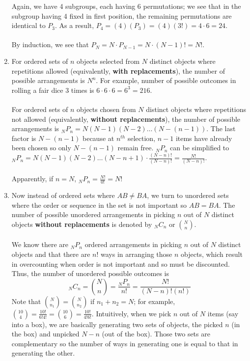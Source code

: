 \documentclass[12pt]{article}
\begin{document}
\begin{enumerate}
{\begin{tabular}{c c c c}
\end{tabular} \par
}

Again, we have 4 subgroups, each having 6 permutations; we see that in the subgroup having 4 fixed in first position, the remaining permutations are identical to $P_3$.
As a result, $P_4 = (4)(P_3) = (4)(3!) = 4 \cdot 6 = 24$.
\\\\
By induction, we see that $P_N = N \cdot P_{N-1}= N \cdot (N-1)! = N! $. 

\item 
For ordered sets of $n$ objects selected from $N$ distinct objects where repetitions allowed (equivalently, \textbf{with replacements}), the number of possible arrangements is $N^n$. 
For example, number of possible outcomes in rolling a fair dice 3 times is $6 \cdot 6 \cdot 6 = 6^3 = 216$.
\\\\
For ordered sets of $n$ objects chosen from $N$ distinct objects where repetitions not allowed (equivalently, \textbf{without replacements}), the number of possible arrangements is 
$_N P_n = N(N-1)(N-2)\dots (N-(n-1)) $. The last factor is $N-(n-1)$ because at $n^{th}$ selection, $n-1$ items have already been chosen so only $ N - (n-1)$ remain free. 
$_N P_n$ can be simplified to $ _N P_n = N(N-1)(N-2) \dots (N-n+1) \cdot \frac{(N-n)!}{(N-n)!} = \frac{N!}{(N-n)!}$.
\\\\
Apparently, if $ n = N$, $_N P_n = \frac{N!}{0!} = N!$


\item 
Now instead of ordered sets where $AB \neq BA$, we turn to unordered sets where the order or sequence in the set is not important so $AB = BA$. 
The number of possible unordered arrangements in picking $n$ out of $N$ distinct objects \textbf{without replacements} is denoted by $_N C_n$ or $\binom{N}{n}$.
\\\\
We know there are $_N P_n$ ordered arrangements in picking $n$ out of $N$ distinct objects and that there are $n!$ ways in arranging those $n$ objects, which result in overcounting when order is not important and so must be discounted. 
Thus, the number of unordered possible outcomes is 
$$
_N C_n = \binom{N}{n} = \frac{_N P_n}{n!} = \frac{N!}{(N-n)!(n!)}
$$
Note that $\binom{N}{n_1} = \binom{N}{n_2}$ if $ n_1 + n_2 = N$; for example, $\binom{10}{4} = \frac{10!}{6!4!} = \binom{10}{6} = \frac{10!}{4!6!}$.
Intuitively, when we pick $n$ out of $N$ items (say into a box), we are basically generating two sets of objects, the picked $n$ (in the box) and unpicked $N-n$ (out of the box). Those two sets are complementary so the number of ways in generating one is equal to that in generating the other.



\end{enumerate}
\end{document}
